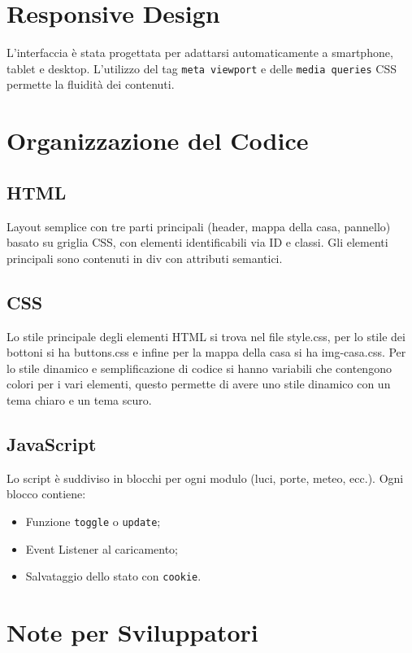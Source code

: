 \documentclass[a4paper,12pt]{article}
\begin{document}
\section{Responsive Design}

L’interfaccia è stata progettata per adattarsi automaticamente a smartphone, tablet e desktop. L’utilizzo del tag \texttt{meta viewport} e delle \texttt{media queries} CSS permette la fluidità dei contenuti.

\section{Organizzazione del Codice}

\subsection*{HTML}

Layout semplice con tre parti principali (header, mappa della casa, pannello) basato su griglia CSS, con elementi identificabili via ID e classi. Gli elementi principali sono contenuti in div con attributi semantici.

\subsection*{CSS}

Lo stile principale degli elementi HTML si trova nel file style.css, per lo stile dei bottoni si ha buttons.css e infine per la mappa della casa si ha img-casa.css. Per lo stile dinamico e semplificazione di codice si hanno variabili che contengono colori per i vari elementi, questo permette di avere uno stile dinamico con un tema chiaro e un tema scuro.

\subsection*{JavaScript}

Lo script è suddiviso in blocchi per ogni modulo (luci, porte, meteo, ecc.). Ogni blocco contiene:

\begin{itemize}
  \item Funzione \texttt{toggle} o \texttt{update};
  \item Event Listener al caricamento;
  \item Salvataggio dello stato con \texttt{cookie}.
\end{itemize}

\section{Note per Sviluppatori}
\end{document}
